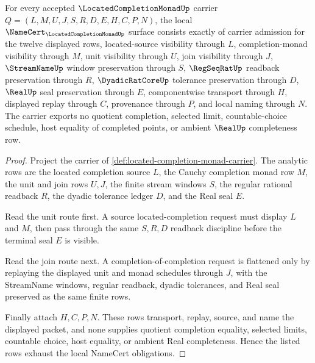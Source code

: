 \begin{theorem}
\label{thm:located-completion-monad-namecert-obligations}
For every accepted $\LocatedCompletionMonadUp$ carrier $Q=(L,M,U,J,S,R,D,E,H,C,P,N)$, the local $\NameCert_{\LocatedCompletionMonadUp}$ surface consists exactly of carrier admission for the twelve displayed rows, located-source visibility through $L$, completion-monad visibility through $M$, unit visibility through $U$, join visibility through $J$, $\StreamNameUp$ window preservation through $S$, $\RegSeqRatUp$ readback preservation through $R$, $\DyadicRatCoreUp$ tolerance preservation through $D$, $\RealUp$ seal preservation through $E$, componentwise transport through $H$, displayed replay through $C$, provenance through $P$, and local naming through $N$. The carrier exports no quotient completion, selected limit, countable-choice schedule, host equality of completed points, or ambient $\RealUp$ completeness row.
\end{theorem}
\begin{proof}
Project the carrier of \autoref{def:located-completion-monad-carrier}. The analytic rows are the located completion source $L$, the Cauchy completion monad row $M$, the unit and join rows $U,J$, the finite stream windows $S$, the regular rational readback $R$, the dyadic tolerance ledger $D$, and the Real seal $E$.

Read the unit route first. A source located-completion request must display $L$ and $M$, then pass through the same $S,R,D$ readback discipline before the terminal seal $E$ is visible.

Read the join route next. A completion-of-completion request is flattened only by replaying the displayed unit and monad schedules through $J$, with the StreamName windows, regular readback, dyadic tolerances, and Real seal preserved as the same finite rows.

Finally attach $H,C,P,N$. These rows transport, replay, source, and name the displayed packet, and none supplies quotient completion equality, selected limits, countable choice, host equality, or ambient Real completeness. Hence the listed rows exhaust the local NameCert obligations.
\end{proof}

